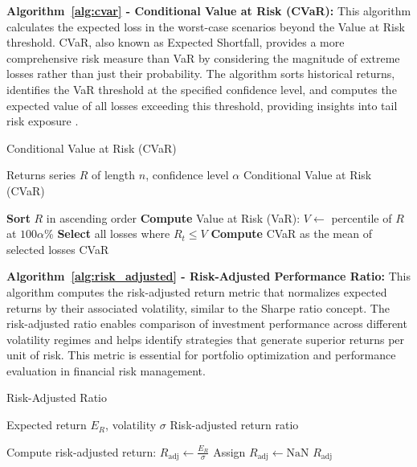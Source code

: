 \documentclass[3p,times,procedia]{elsarticle}
\begin{document}
\textbf{Algorithm~\ref{alg:cvar} - Conditional Value at Risk (CVaR):} This algorithm calculates the expected loss in the worst-case scenarios beyond the Value at Risk threshold. CVaR, also known as Expected Shortfall, provides a more comprehensive risk measure than VaR by considering the magnitude of extreme losses rather than just their probability. The algorithm sorts historical returns, identifies the VaR threshold at the specified confidence level, and computes the expected value of all losses exceeding this threshold, providing insights into tail risk exposure \cite{Rockafellar2000}.

\begin{algorithm}[H]
\caption{Conditional Value at Risk (CVaR)}
\label{alg:cvar}
\begin{algorithmic}[1]
    \Require Returns series $R$ of length $n$, confidence level $\alpha$
    \Ensure Conditional Value at Risk (CVaR)
    
    \State \textbf{Sort} $R$ in ascending order 
    \State \textbf{Compute} Value at Risk (VaR): $V \gets$ percentile of $R$ at $100\alpha$\%
    \State \textbf{Select} all losses where $R_t \leq V$
    \State \textbf{Compute} CVaR as the mean of selected losses
    \State \Return CVaR
\end{algorithmic}
\end{algorithm}

\textbf{Algorithm~\ref{alg:risk_adjusted} - Risk-Adjusted Performance Ratio:} This algorithm computes the risk-adjusted return metric that normalizes expected returns by their associated volatility, similar to the Sharpe ratio concept. The risk-adjusted ratio enables comparison of investment performance across different volatility regimes and helps identify strategies that generate superior returns per unit of risk. This metric is essential for portfolio optimization and performance evaluation in financial risk management.

\begin{algorithm}[H]
\caption{Risk-Adjusted Ratio}
\label{alg:risk_adjusted}
\begin{algorithmic}[1]
    \Require Expected return $E_R$, volatility $\sigma$
    \Ensure Risk-adjusted return ratio
    
        \State Compute risk-adjusted return: $R_{\text{adj}} \gets \frac{E_R}{\sigma}$
    \Else
        \State Assign $R_{\text{adj}} \gets \text{NaN}$
    \EndIf
    \State \Return $R_{\text{adj}}$
\end{algorithmic}
\end{algorithm}
\end{document}
